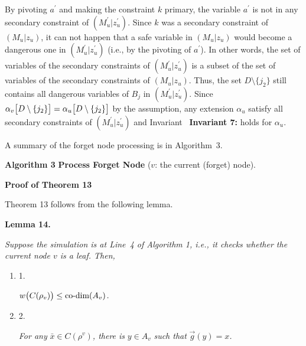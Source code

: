 \documentclass[10pt,a4paper]{article}
\begin{document}
By pivoting $a^{\prime}$ and making the constraint $k$ primary, the variable $a^{\prime}$ is not in any secondary constraint of $(M^{\prime}_{u}|z^{\prime}_{u})$.
Since $k$ was a secondary constraint of $(M_{u}|z_{u})$, it can not happen that a safe variable in $(M_{u}|z_{u})$ would become a dangerous one in $(M^{\prime}_{u}|z^{\prime}_{u})$ (i.e., by the pivoting of $a^{\prime}$).
In other words, the set of variables of the secondary constraints of $(M^{\prime}_{u}|z^{\prime}_{u})$ is a subset of the set of variables of the secondary constraints of $(M_{u}|z_{u})$.
Thus, the set $D\setminus\{j_{2}\}$ still contains all dangerous variables of $B_{j}$ in $(M^{\prime}_{u}|z^{\prime}_{u})$.
Since $\alpha_{v}\bigl{[}D\setminus\{j_{2}\}\bigr{]}=\alpha_{u}\bigl{[}D\setminus\{j_%
{2}\}\bigr{]}$ by the assumption, any extension $\alpha_{u}$ satisfy all secondary constraints of $(M^{\prime}_{u}|z^{\prime}_{u})$ and Invariant \textbf{ Invariant 7:} holds for $\alpha_{u}$.\par




A summary of the forget node processing is in Algorithm 3.\par



\textbf{Algorithm 3}  \textbf{Process Forget Node} ($v$: the current (forget) node).





\par\medskip\noindent\textbf{Proof of Theorem 13
}\par




Theorem 13 follows from the following lemma.\par





\par\medskip\noindent\textbf{
\textbf{Lemma 14}\textbf{.}
}\par



\emph{Suppose the simulation is at Line 4 of Algorithm 1, i.e., it checks whether the current node $v$ is a leaf.
Then,}\par


\begin{enumerate}


\item[] 
1. 


$w\bigl{(}C(\rho_{v})\bigr{)}\leq\text{co-dim}(A_{v})$\emph{.}\par





\item[] 
2. 


\emph{For any }$\bar{x}\in C(\rho^{v})$\emph{, there is }$y\in A_{v}$\emph{ such that }$\overrightarrow{g}(y)=x$\emph{.}\par





\end{enumerate}
\end{document}
